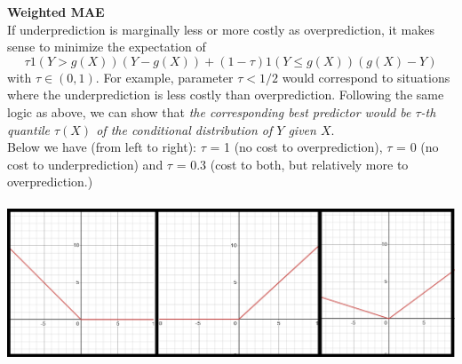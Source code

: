 \documentclass[DIV=14,titlepage=false]{scrreprt}
\begin{document}
\textbf{Weighted MAE}\\
If underprediction is marginally less or more costly as overprediction, it makes sense to minimize the expectation of
\[
\tau 1(Y > g(X))(Y - g(X)) + (1 - \tau) 1(Y \leq g(X))(g(X) - Y)
\]
with \( \tau \in (0, 1) \). For example, parameter \( \tau < 1/2 \) would correspond to situations where the underprediction is less costly than overprediction. Following the same logic as above, we can show that \textit{the corresponding best predictor would be \( \tau \)-th quantile \( \tau(X) \) of the conditional distribution of \( Y \) given \( X \)}.\\
Below we have (from left to right): $\tau$ = 1 (no cost to overprediction), $\tau$ = 0 (no cost to underprediction) and $\tau$ = 0.3 (cost to both, but relatively more to overprediction.)\\\\
\includegraphics[width=\textwidth]{./Images/weightedMAD.png}
\end{document}
